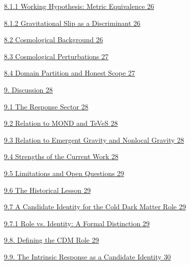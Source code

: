 \hyperref[working-hypothesis-metric-equivalence]{8.1.1 Working Hypothesis: Metric Equivalence \hyperref[working-hypothesis-metric-equivalence]{26}}

\hyperref[gravitational-slip-as-a-discriminant]{8.1.2 Gravitational Slip as a Discriminant \hyperref[gravitational-slip-as-a-discriminant]{26}}

\hyperref[cosmological-background]{8.2 Cosmological Background \hyperref[cosmological-background]{26}}

\hyperref[cosmological-perturbations]{8.3 Cosmological Perturbations \hyperref[cosmological-perturbations]{27}}

\hyperref[domain-partition-and-honest-scope]{8.4 Domain Partition and Honest Scope \hyperref[domain-partition-and-honest-scope]{27}}

\hyperref[discussion]{9. Discussion \hyperref[discussion]{28}}

\hyperref[the-response-sector]{9.1 The Response Sector \hyperref[the-response-sector]{28}}

\hyperref[relation-to-mond-and-teves]{9.2 Relation to MOND and TeVeS \hyperref[relation-to-mond-and-teves]{28}}

\hyperref[relation-to-emergent-gravity-and-nonlocal-gravity]{9.3 Relation to Emergent Gravity and Nonlocal Gravity \hyperref[relation-to-emergent-gravity-and-nonlocal-gravity]{28}}

\hyperref[strengths-of-the-current-work]{9.4 Strengths of the Current Work \hyperref[strengths-of-the-current-work]{28}}

\hyperref[limitations-and-open-questions]{9.5 Limitations and Open Questions \hyperref[limitations-and-open-questions]{29}}

\hyperref[the-historical-lesson]{9.6 The Historical Lesson \hyperref[the-historical-lesson]{29}}

\hyperref[a-candidate-identity-for-the-cold-dark-matter-role]{9.7 A Candidate Identity for the Cold Dark Matter Role \hyperref[a-candidate-identity-for-the-cold-dark-matter-role]{29}}

\hyperref[role-vs.-identity-a-formal-distinction]{9.7.1 Role vs. Identity: A Formal Distinction \hyperref[role-vs.-identity-a-formal-distinction]{29}}

\hyperref[defining-the-cdm-role]{9.8. Defining the CDM Role \hyperref[defining-the-cdm-role]{29}}

\hyperref[the-intrinsic-response-as-a-candidate-identity]{9.9. The Intrinsic Response as a Candidate Identity \hyperref[the-intrinsic-response-as-a-candidate-identity]{30}}


